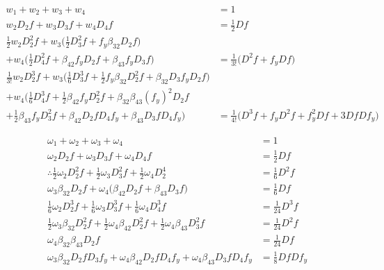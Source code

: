 \documentclass[12 pt]{article}
\begin{document}
	
	\begin{align*}
		w_{1} + w_{2} + w_{3} + w_{4} &= 1\\
		w_{2}D_{2}f + w_{3}D_{3}f + w_{4}D_{4}f&= \frac{1}{2}Df\\
		\frac{1}{2}w_{2}D_{2}^{2}f + w_{3}\bigg(\frac{1}{2}D_{3}^{2}f + f_{y}\beta_{32}D_{2}f\bigg) & \\
		+ w_{4}\bigg(\frac{1}{2}D_{4}^{2}f + \beta_{42}f_{y}D_{2}f + \beta_{43}f_{y}D_{3}f\bigg) &= \frac{1}{3!}\bigg(D^{2}f+f_{y}Df\bigg)\\
		\frac{1}{3!}w_{2}D_{2}^{3}f + w_{3}\bigg(\frac{1}{6}D_{3}^{3}f + \frac{1}{2}f_{y}\beta_{32}D_{2}^{2}f + \beta_{32}D_{3}f_{y}D_{2}f\bigg) & \\
		+w_{4}\bigg(\frac{1}{6}D^{3}_{4}f + \frac{1}{2}\beta_{42}f_{y}D_{2}^{2}f+ \beta_{32}\beta_{43}(f_{y})^{2}D_{2}f & \\
		+ \frac{1}{2}\beta_{43}f_{y}D_{3}^{2}f + \beta_{42}D_{2}fD_{4}f_{y}	+ \beta_{43}D_{3}fD_{4}f_{y}\bigg) &= \frac{1}{4!}\bigg(D^{3}f + f_{y}D^{2}f + f_{y}^{2}Df + 3DfDf_{y}\bigg)
	\end{align*}
	
	\begin{align*}
		\omega_{1} + \omega_{2} + \omega_{3} + \omega_{4} &= 1\\
		\omega_{2}D_{2}f + \omega_{3}D_{3}f + \omega_{4}D_{4}f &= \frac{1}{2}Df\\
		\therefore 
		\frac{1}{2}\omega_{2}D_{2}^{2}f + \frac{1}{2}\omega_{3}D_{3}^{2}f + \frac{1}{2}\omega_{4}D_{2}^{4}&= \frac{1}{6}D^{2}f\\
		\omega_{3}\beta_{32}D_{2}f + \omega_{4}\bigg(\beta_{42}D_{2}f + \beta_{43}D_{3}f\bigg) &= \frac{1}{6}Df\\
		\frac{1}{6}\omega_{2}D_{2}^{3}f + \frac{1}{6}\omega_{3}D_{3}^{3}f + \frac{1}{6}\omega_{4}D_{4}^{3}f &= \frac{1}{24}D^{3}f\\
		\frac{1}{2}\omega_{3}\beta_{32}D_{2}^{2}f + \frac{1}{2}\omega_{4}\beta_{42}D_{2}^{2}f + \frac{1}{2}\omega_{4}\beta_{43}D_{3}^{2}f &= \frac{1}{24}D^{2}f\\
		\omega_{4}\beta_{32}\beta_{43}D_{2}f &= \frac{1}{24}Df\\
		\omega_{3}\beta_{32}D_{2}fD_{3}f_{y} + \omega_{4}\beta_{42}D_{2}fD_{4}f_{y} + \omega_{4}\beta_{43}D_{3}fD_{4}f_{y} &= \frac{1}{8}DfDf_{y}
	\end{align*}
	
\end{document}

